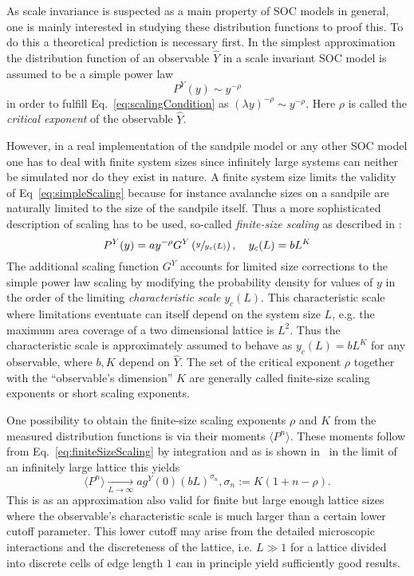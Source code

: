 As scale invariance is suspected as a main property of SOC models in general, one is mainly interested in studying
these distribution functions to proof this. To do this a theoretical prediction is necessary first.
In the simplest approximation the distribution function of an observable $\hat{Y}$ in a scale invariant SOC model
is assumed to be a simple power law
\begin{equation}\label{eq:simpleScaling}
P^{Y}(y) \sim y^{-\rho}
\end{equation}
in order to fulfill Eq.~\eqref{eq:scalingCondition} as $(\lambda y)^{-\rho}\sim y^{-\rho}$.
Here $\rho$ is called the \emph{critical exponent} of the observable $\hat{Y}$.

However, in a real implementation of the sandpile model or any other SOC model one has to deal with finite system sizes
since infinitely large systems can neither be simulated nor do they exist in nature.
A finite system size limits the validity of Eq~\eqref{eq:simpleScaling} because for instance avalanche sizes on a
sandpile are naturally limited to the size of the sandpile itself. Thus a more sophisticated description of scaling
has to be used, so-called \emph{finite-size scaling} as described in \cite{SOC-book}:
\begin{equation}\label{eq:finiteSizeScaling}
P^{Y}(y) = a y^{-\rho} G^{Y}\left(\sfrac{y}{y_c(L)}\right), \quad y_c(L)=b L^K
\end{equation}
The additional scaling function $G^{Y}$ accounts for limited size corrections to the simple power law scaling
by modifying the probability density for values of $y$ in the order of the limiting \emph{characteristic scale}
$y_c(L)$. This characteristic scale where limitations eventuate can itself depend on the system size $L$,
e.g. the maximum area coverage of a two dimensional lattice is $L^2$. Thus the characteristic scale is approximately
assumed to behave as $y_c(L)=b L^K$ for any observable, where $b,K$ depend on $\hat{Y}$.
The set of the critical exponent $\rho$ together with the \enquote{observable's dimension} $K$ are
generally called finite-size scaling exponents or short scaling exponents.

One possibility to obtain the finite-size scaling exponents $\rho$ and $K$ from the measured distribution functions
is via their moments $\langle P^n\rangle$. These moments follow from Eq.~\eqref{eq:finiteSizeScaling} by integration
and as is shown in~\cite{SOC-book} in the limit of an infinitely large lattice this yields
\begin{equation}\label{eq:momentScaling}
\langle P^n\rangle \xrightarrow[L\to\infty]{} a g^{Y}(0) (bL)^{\sigma_n}, \sigma_n := K(1+n-\rho).
\end{equation}
This is as an approximation also valid for finite but large enough lattice sizes where the observable's
characteristic scale is much larger than a certain lower cutoff parameter. This lower cutoff may arise from the
detailed microscopic interactions and the discreteness of the lattice, i.e. $L \gg 1$ for a lattice divided into
discrete cells of edge length $1$ can in principle yield sufficiently good results.


